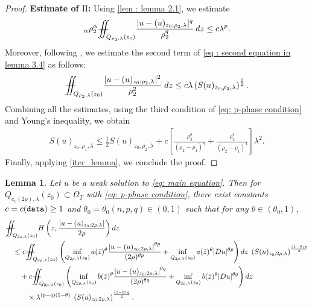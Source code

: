 \documentclass[11pt,oneside, english,reqno,twoside a4paper]{amsart}
\newtheorem{lemma}{Lemma}[section]
\theoremstyle{definition}
\numberwithin{theorem}{section}
\numberwithin{equation}{section}
\newcommand{\iintss}{{\int\hspace{-0.28cm}\int}}
\newcommand{ \miints }{{\iintss\hspace{-0.56cm} -\hspace{-0.15cm}-}}
\newcommand{\miint}[1]{{\miints_{\hspace{-0.13cm}#1}}}
\begin{document}
\begin{proof}
 \textbf{Estimate of $\mathrm{II}$:} Using \cref{lem : lemma 2.1}, we estimate
 \begin{align*}
  [b]_{\alpha}\rho^{\alpha}_2\miint{Q_{\rho_2, \lambda}(z_0)} \frac{|u-(u)_{z_0;\rho_2,\lambda}|^q}{\rho^q_2}\,dz \leq c\lambda^p .  
 \end{align*}
 Moreover, following \cite[Lemma 4.3]{2023_Gradient_Higher_Integrability_for_Degenerate_Parabolic_Double-Phase_Systems}, we estimate the second term of \eqref{eq : second equation in lemma 3.4} as follows:
 \begin{align*}
\miint{Q_{\rho_2,\lambda}(z_0)}\frac{|u-(u)_{z_0;\rho_2,\lambda}|^2}{\rho_2^2}\; dz \leq c \lambda \left(S(u)_{z_0, \rho_2, \lambda}\right)^{\frac{1}{2}}.
 \end{align*}
Combining all the estimates, using the third condition of \eqref{eq: p-phase condition} and Young's inequality, we obtain
\begin{align*}
 S(u)_{z_0, \rho_1, \lambda}\leq \frac{1}{2}S(u)_{z_0, \rho_2, \lambda}+c \left[\frac{\rho^q_2}{(\rho_2-\rho_1)^q}+\frac{\rho^4_2}{(\rho_2-\rho_1)^4}\right]\lambda^2.   
\end{align*}
Finally, applying \cref{iter_lemma}, we conclude the proof.
\end{proof}
\begin{lemma}\label{lem : lemma 5.2}
    Let $u$ be a weak solution to \eqref{eq: main equation}. Then for $Q_{c_v(2 \rho),\lambda}\left(z_0\right) \subset \Omega_T$ with \eqref{eq: p-phase condition}, there exist constants $c=c(\textnormal{\texttt{data}}) \geq 1$ and $\theta_0=\theta_0(n, p, q) \in(0,1)$ such that for any $\theta \in\left(\theta_0, 1\right)$,
    $$
    \begin{aligned}
    &\miint{Q_{2 \rho,\lambda}\left(z_0\right)} H\left(z,\frac{\left|u-(u)_{z_0 ; 2 \rho,\lambda}\right|}{2 \rho}\right) d z \\
    & \quad \leq c \miint{Q_{2 \rho,\lambda}\left(z_0\right)}\left(\inf_{Q_{2\rho, \lambda}(z_0)}a(\tilde{z})^{\theta}\frac{\left|u-(u)_{z_0 ; 2 \rho,\lambda}\right|^{\theta p}}{(2 \rho)^{\theta p}}+\inf_{Q_{2\rho, \lambda}(z_0)}a(\tilde{z})^{\theta}|D u|^{\theta p}\right) d z\;\left(S(u)_{z_0 ; 2 \rho,\lambda}\right)^{\frac{(1-\theta) p}{2}} \\
    &\qquad+c \miint{Q_{2 \rho,\lambda}\left(z_0\right)}\left(\inf _{Q_{2 \rho,\lambda}\left(z_0\right)} b(\tilde{z})^\theta \frac{\left|u-(u)_{z_0 ; 2 \rho,\lambda}\right|^{\theta q}}{(2 \rho)^{\theta q}}+\inf _{Q_{2 \rho,\lambda}\left(z_0\right)} b(\tilde{z})^\theta|D u|^{\theta q}\right) dz \\
    & \qquad \quad \times \lambda^{(p-q)(1-\theta)}\;\left(S(u)_{z_0 ; 2 \rho,\lambda}\right)^{\frac{(1-\theta) q}{2}}.
    \end{aligned}
    $$
\end{lemma}
\end{document}
